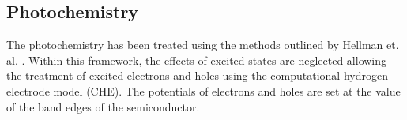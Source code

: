 \documentclass[catalysts,article,submit,moreauthors,pdftex,10pt,a4paper]{mdpi}
\theoremstyle{mdpi}
\newcounter{ex}
\newcounter{re}
\theoremstyle{mdpidefinition}
\begin{document}
\subsection{Photochemistry}
The photochemistry has been treated using the methods outlined by Hellman et. al. \cite{Hellman2017}. Within this framework, the effects of excited states are neglected allowing the treatment of excited electrons and holes using the computational hydrogen electrode model (CHE). The potentials of electrons and holes are set at the value of the band edges of the semiconductor.






\end{document}
